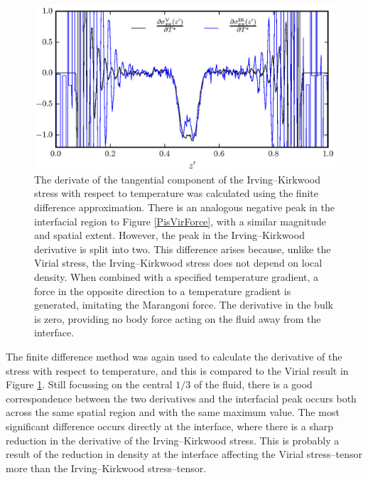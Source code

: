 \begin{figure}[h!]
\centering
\includegraphics[scale=1.0]{PisIKForce}
\caption{The derivate of the tangential component of the Irving--Kirkwood stress with respect to temperature was calculated using the finite difference approximation.
There is an analogous negative peak in the interfacial region to Figure \ref{PisVirForce}, with a similar magnitude and spatial extent.
However, the peak in the Irving--Kirkwood derivative is split into two.
This difference arises because, unlike the Virial stress, the Irving--Kirkwood stress does not depend on local density.
When combined with a specified temperature gradient, a force in the opposite direction to a temperature gradient is generated, imitating the Marangoni force.
The derivative in the bulk is zero, providing no body force acting on the fluid away from the interface.
}
\label{PisIKForce}
\end{figure}
The finite difference method was again used to calculate the derivative of the stress with respect to temperature, and this is compared to the Virial result in Figure \ref{PisIKForce}.
Still focussing on the central $1/3$ of the fluid, there is a good correspondence between the two derivatives and the interfacial peak occurs both across the same spatial region and with the same maximum value.
The most significant difference occurs directly at the interface, where there is a sharp reduction in the derivative of the Irving--Kirkwood stress.
This is probably a result of the reduction in density at the interface affecting the Virial stress--tensor more than the Irving--Kirkwood stress--tensor.
\FloatBarrier

